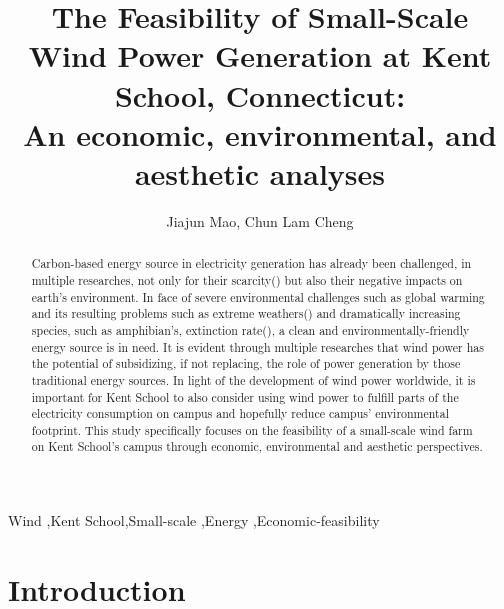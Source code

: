 \documentclass[review]{elsarticle}
\begin{document}
\begin{frontmatter}

\title{The Feasibility of Small-Scale Wind Power Generation at Kent School, Connecticut: \\An economic, environmental, and aesthetic analyses}

\author{Jiajun Mao, Chun Lam Cheng}
\address{1 Macedonia Rd., Kent, CT}

\begin{abstract}
\indent Carbon-based energy source in electricity generation has already been challenged, in multiple researches, not only for their scarcity(\cite{mikael_depletion_of_fossil_fuel}) but also their negative impacts on earth’s environment. In face of severe environmental challenges such as global warming and its resulting problems such as extreme weathers(\cite{mikael_depletion_of_fossil_fuel}) and dramatically increasing species, such as amphibian's, extinction rate(\cite{alan_amphibian_extinction}), a clean and environmentally-friendly energy source is in need. It is evident through multiple researches that wind power has the potential of subsidizing, if not replacing, the role of power generation by those traditional energy sources. In light of the development of wind power worldwide, it is important for Kent School to also consider using wind power to fulfill parts of the electricity consumption on campus and hopefully reduce campus’ environmental footprint. This study specifically focuses on the feasibility of a small-scale wind farm on Kent School’s campus through economic, environmental and aesthetic perspectives.
\end{abstract}

\begin{keyword}
Wind \sep Kent School\sep Small-scale \sep Energy \sep Economic-feasibility
\end{keyword}

\end{frontmatter}

\linenumbers

\clearpage
\section{Introduction}
\end{document}
